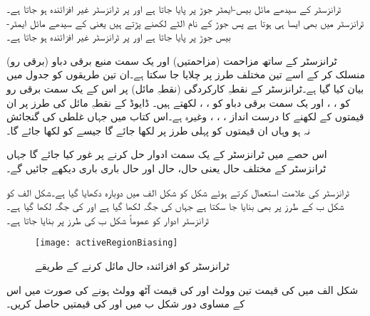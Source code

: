  ٹرانزسٹر کے سیدھے مائل بیس-ایمٹر  جوڑ پر  پایا جاتا ہے اور   پر ٹرانزسٹر غیر افزائندہ ہو جاتا ہے۔ ٹرانزسٹر میں بھی ایسا ہی ہوتا ہے پس جوڑ کے نام الٹے لکھنے پڑتے ہیں یعنی  کے سیدھے مائل ایمٹر-بیس جوڑ پر  پایا جاتا ہے اور   پر ٹرانزسٹر غیر افزائندہ ہو جاتا ہے۔

ٹرانزسٹر کے ساتھ مزاحمت (مزاحمتیں) اور یک سمت منبع برقی دباو  (برقی رو) منسلک کر کے اسے تین مختلف طرز پر چلایا جا سکتا ہے۔ان تین طریقوں کو جدول    میں بیان کیا گیا ہے۔ٹرانزسٹر کے نقطہِ کارکردگی (نقطہِ مائل) پر اس کے یک سمت برقی رو کو ، ، اور یک سمت برقی دباو کو   ، ،  لکھتے ہیں۔ ڈایوڈ کے نقطہِ مائل کی طرز پر ان قیمتوں کے لکھنے کا درست انداز  ، ، ،  وغیرہ ہے۔اس کتاب میں جہاں غلطی کی گنجائش نہ ہو وہاں ان قیمتوں کو پہلی طرز پر لکھا جائے گا جیسے   کو    لکھا جائے گا۔

اس حصے میں ٹرانزسٹر کے یک سمت ادوار حل کرنے پر غور کیا جائے گا جہاں ٹرانزسٹر کے مختلف حال یعنی  حال،  حال اور  حال باری باری دیکھے جائیں گے۔

ٹرانزسٹر کی علامت استعمال کرتے ہوئے شکل  کو شکل  الف میں دوبارہ دکھایا گیا ہے۔شکل  الف کو شکل  ب کے طرز پر بھی بنایا جا سکتا ہے جہاں  کی جگہ  لکھا گیا ہے اور  کی جگہ  لکھا گیا ہے۔ٹرانزسٹر ادوار کو عموماً شکل  ب کی طرز پر بنایا جاتا ہے۔
\begin{figure}
\centering
\texttt{[image: activeRegionBiasing]}
\caption{ ٹرانزسٹر کو افزائندہ حال مائل کرنے کے طریقے}
\label{شکل_افزائندہ_حال_مائل_کرنا}
\end{figure}

شکل  الف میں  کی قیمت تین وولٹ اور   کی قیمت آٹھ وولٹ ہونے کی صورت میں اس کے مساوی دور شکل  ب میں  اور کی قیمتیں حاصل کریں۔

